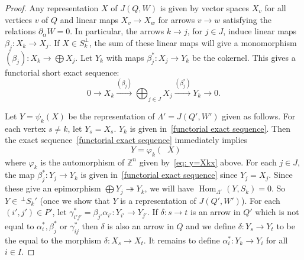 \documentclass[10pt]{amsart}
\theoremstyle{definition}
\newcommand{\onto}{\twoheadrightarrow}
\DeclareMathOperator{\Hom}{Hom}%
\DeclareMathOperator{\undim}{\underline{dim}}
\newcommand{\field}[1]{\mathbb{#1}}
\newcommand{\ZZ}{\ensuremath{{\field{Z}}}}
\begin{document}
\begin{proof}%



Any representation $X$ of $J(Q,W)$ is given by vector spaces $X_v$ for all vertices $v$ of $Q$ and linear maps $X_v\to X_w$ for arrows $v\to w$ satisfying the relations $\partial_\alpha W=0$. In particular, the arrows $k\to j$, for $j\in J$, induce linear maps $\beta_j:X_k\to X_j$. If $X\in S_k^\perp$, the sum of these linear maps will give a monomorphism $(\beta_j):X_k\to \bigoplus X_j$. Let $Y_k$ with maps $\beta_j^\ast:X_j\to Y_k$ be the cokernel. This gives a functorial short exact sequence:
\begin{equation}\label{functorial exact sequence}
	0\to X_k\xrightarrow{(\beta_j)}\bigoplus_{j\in J} X_j\xrightarrow{(\beta_j^\ast)}Y_k\to 0.
\end{equation}

Let $Y=\psi_k(X)$ be the representation of $\Lambda'=J(Q',W')$ given as follows. For each vertex $s\neq k$, let $Y_s=X_s$. $Y_k$ is given in~\eqref{functorial exact sequence}. Then the exact sequence~\eqref{functorial exact sequence} immediately implies
\[
	\undim Y=\varphi_k(\undim X)
\]
where $\varphi_k$ is the automorphism of $\ZZ^n$ given by~\eqref{eq: y=Xkx} above. For each $j\in J$, the map $\beta_j^\ast:Y_j\to Y_k$ is given in~\eqref{functorial exact sequence} since $Y_j=X_j$. Since these give an epimorphism $\bigoplus Y_j\onto Y_k$, we will have $\Hom_{\Lambda'}(Y,S_k)=0$. So $Y\in\,^{\perp}S_k'$ (once we show that $Y$ is a representation of $J(Q',W')$). For each $(i',j')\in P'$, let $\gamma_{i'j'}^\ast= \beta_{j'}\alpha_{i'}: Y_{i'}\to Y_{j'}$. If $\delta:s\to t$ is an arrow in $Q'$ which is not equal to $\alpha_i^\ast,\beta_j^\ast$ or $\gamma_{ij}^\ast$ then $\delta$ is also an arrow in $Q$ and we define $\delta:Y_s\to Y_t$ to be the equal to the morphism $\delta:X_s\to X_t$. It remains to define $\alpha_i^\ast:Y_k\to Y_i$ for all $i\in I$.



\end{proof}
\end{document}
